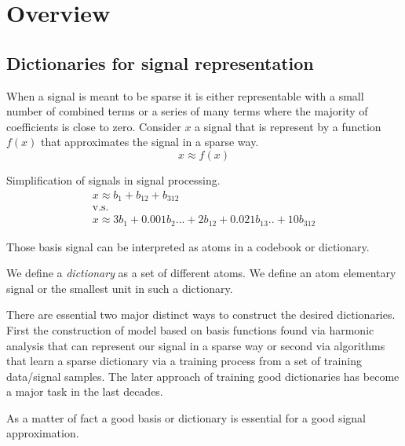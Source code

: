 \chapter{Overview}

\section{Dictionaries for signal representation}

When a signal is meant to be sparse it is either representable with a small
number of combined terms or a series of many terms where the majority of
coefficients is close to zero. Consider $x$ a signal that is represent by a
function $f(x)$ that approximates the signal in a sparse way.
\begin{equation*}
x \approx f\left(x\right)
\end{equation*}

Simplification of signals in signal processing.
\begin{gather*}
x \approx b_{1} + b_{12} + b_{312}\\
 \text{v.s.}\\ x \approx 3b_{1} + 0.001b_{2} ... + 2b_{12} + 0.021b_{13} .. + 10b_{312}
\end{gather*}



Those basis signal can be interpreted as atoms in a codebook or dictionary.

We define a \emph{dictionary} as a set of different atoms. We define an atom
elementary signal or the smallest unit in such a dictionary.

There are essential two major distinct ways to construct the 
desired dictionaries. First the construction of model based on basis functions
found via harmonic analysis that can represent our signal in a sparse way or
second via algorithms that learn a sparse dictionary via a training process from
a set of training data/signal samples. The later approach of training good
dictionaries has become a major task in the last decades\cite{Mairal2010}.

As a matter of fact a good basis or dictionary is essential for a good
signal approximation\cite{}.



